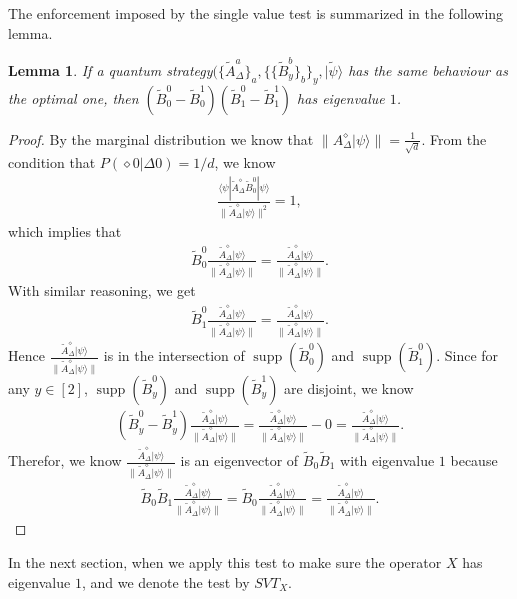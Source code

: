 \documentclass[11pt,letterpaper]{article}
\newcommand{\ket}[1]{|#1\rangle}
\newcommand{\bra}[1]{\langle#1|}
\DeclareMathOperator{\supp}{supp}
\newcommand{\1}{\mathbb{1}}
\newcommand{\SVT}{SVT}
\newcommand{\tA}{\tilde{A}}
\newcommand{\tB}{\tilde{B}}
\newcommand{\tpsi}{\tilde{\psi}}
\newcommand{\tri}{\Delta}
\newtheorem{lemma}[theorem]{Lemma}
\theoremstyle{definition}
\begin{document}
The enforcement imposed by the single value test is summarized in the following lemma.
\begin{lemma}
	\label{lm:svt_comp}
	If a quantum strategy$(\{\tA_\tri^a\}_a, \{\{\tB_y^b\}_b\}_y, \ket{\tpsi}$ has the same behaviour as
	the optimal one, then $(\tB_0^0 - \tB_0^1)(\tB_1^0-\tB_1^1)$ has eigenvalue $1$.
\end{lemma}
\begin{proof}
By the marginal distribution we know that $\| A_\tri^\diamond \ket{\psi}\| = \frac{1}{\sqrt{d}}$.
From the condition that $P(\diamond 0|\tri 0) = 1/d$, we know
\begin{align}
	\frac{  \bra{\psi} \tA_\tri^\diamond  \tB_0^0 \ket{\psi}}{\| \tA_\tri^\diamond \ket{\psi}\|^2} = 1,
\end{align}
which implies that 
\begin{align}
 \tB_0^0 \frac{\tA_\tri^\diamond \ket{\psi}}{\| \tA_\tri^\diamond \ket{\psi}\|} = \frac{\tA_\tri^\diamond \ket{\psi}}{\| \tA_\tri^\diamond \ket{\psi}\|}.
\end{align}
With similar reasoning, we get
\begin{align}
 \tB_1^0 \frac{\tA_\tri^\diamond \ket{\psi}}{\| \tA_\tri^\diamond \ket{\psi}\|} = \frac{\tA_\tri^\diamond \ket{\psi}}{\| \tA_\tri^\diamond \ket{\psi}\|}.
\end{align}
Hence $ \frac{\tA_\tri^\diamond \ket{\psi}}{\| \tA_\tri^\diamond \ket{\psi}\|} $ is in the intersection of $\supp(\tB_0^0)$ and $\supp(\tB_1^0)$.
Since for any $y \in [2]$, $\supp(\tB_y^0)$ and $\supp(\tB_y^1)$ are disjoint, we know
\begin{align*}
	(\tB_y^0 - \tB_y^1)  \frac{\tA_\tri^\diamond \ket{\psi}}{\| \tA_\tri^\diamond \ket{\psi}\|}  =  \frac{\tA_\tri^\diamond \ket{\psi}}{\| \tA_\tri^\diamond \ket{\psi}\|} - 0 = \frac{\tA_\tri^\diamond \ket{\psi}}{\| \tA_\tri^\diamond \ket{\psi}\|}. 
\end{align*}
Therefor, we know $ \frac{\tA_\tri^\diamond \ket{\psi}}{\| \tA_\tri^\diamond \ket{\psi}\|} $ is an eigenvector of $\tB_0\tB_1$ with eigenvalue $1$ because
\begin{align}
	\tB_0\tB_1 \frac{\tA_\tri^\diamond \ket{\psi}}{\| \tA_\tri^\diamond \ket{\psi}\|} = \tB_0 \frac{\tA_\tri^\diamond \ket{\psi}}{\| \tA_\tri^\diamond \ket{\psi}\|} =  \frac{\tA_\tri^\diamond \ket{\psi}}{\| \tA_\tri^\diamond \ket{\psi}\|}.
\end{align}
\end{proof}
In the next section, when we apply this test to make sure the operator $X$ has eigenvalue $1$, and 
we denote the test by $\SVT_X$.
\end{document}
